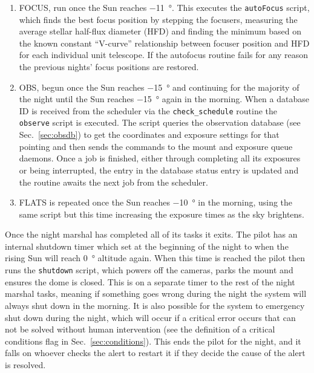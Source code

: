 \begin{colsection}
\begin{colsection}
\begin{enumerate}
\item FOCUS, run once the Sun reaches \SI{-11}{\degree}. This executes the \texttt{autoFocus} script, which finds the best focus position by stepping the focusers, measuring the average stellar half-flux diameter (HFD) and finding the minimum based on the known constant ``V-curve'' relationship between focuser position and HFD for each individual unit telescope\cite{autofocus}. If the autofocus routine fails for any reason the previous nights' focus positions are restored.

\item OBS, begun once the Sun reaches \SI{-15}{\degree} and continuing for the majority of the night until the Sun reaches \SI{-15}{\degree} again in the morning. When a database ID is received from the scheduler via the \texttt{check\_schedule} routine the \texttt{observe} script is executed. The script queries the observation database (see Sec.~\ref{sec:obsdb}) to get the coordinates and exposure settings for that pointing and then sends the commands to the mount and exposure queue daemons. Once a job is finished, either through completing all its exposures or being interrupted, the entry in the database status entry is updated and the routine awaits the next job from the scheduler.

\item FLATS is repeated once the Sun reaches \SI{-10}{\degree} in the morning, using the same script but this time increasing the exposure times as the sky brightens.

\end{enumerate}

Once the night marshal has completed all of its tasks it exits. The pilot has an internal shutdown timer which set at the beginning of the night to when the rising Sun will reach \SI{0}{\degree} altitude again. When this time is reached the pilot then runs the \texttt{shutdown} script, which powers off the cameras, parks the mount and ensures the dome is closed. This is on a separate timer to the rest of the night marshal tasks, meaning if something goes wrong during the night the system will always shut down in the morning. It is also possible for the system to emergency shut down during the night, which will occur if a critical error occurs that can not be solved without human intervention (see the definition of a critical conditions flag in Sec.~\ref{sec:conditions}). This ends the pilot for the night, and it falls on whoever checks the alert to restart it if they decide the cause of the alert is resolved.


\end{colsection}
\end{colsection}
